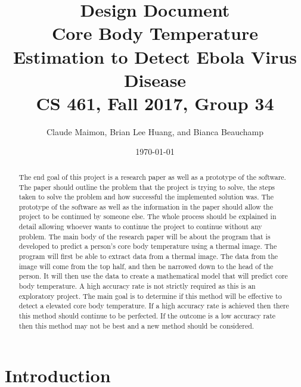 ﻿\documentclass[onecolumn, draftclsnofoot,10pt, compsoc]{IEEEtran}
\title{%
  Design Document \\
  \vspace{0.4cm}
  \large Core Body Temperature Estimation to Detect Ebola Virus Disease \\
  \vspace{0.4cm}
  \large CS 461, Fall 2017, Group 34\\
    }
\author{Claude Maimon, Brian Lee Huang, and Bianca Beauchamp}
\date{\today}
\begin{document}
\maketitle

\begin{abstract}
	The end goal of this project is a research paper as well as a prototype of the software. The paper should outline the problem that the project is trying to solve, the steps taken to solve the problem and how successful the implemented solution was. The prototype of the software as well as the information in the paper should allow the project to be continued by someone else. The whole process should be explained in detail allowing whoever wants to continue the project to continue without any problem. The main body of the research paper will be about the program that is developed to predict a person's core body temperature using a thermal image. The program will first be able to extract data from a thermal image. The data from the image will come from the top half, and then be narrowed down to the head of the person. It will then use the data to create a mathematical model that will predict core body temperature. A high accuracy rate is not strictly required as this is an exploratory project. The main goal is to determine if this method will be effective to detect a elevated core body temperature. If a high accuracy rate is achieved then there this method should continue to be perfected. If the outcome is a low accuracy rate then this method may not be best and a new method should be considered.
\end{abstract}

\newpage

\tableofcontents
\newpage
\section{Introduction}
\end{document}
